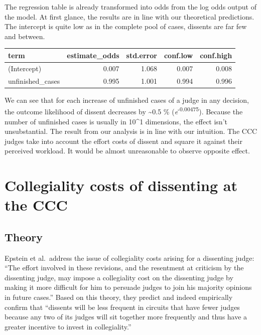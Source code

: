 \documentclass[
  11pt,
]{article}
\begin{document}
The regression table is already transformed into odds from the log odds
output of the model. At first glance, the results are in line with our
theoretical predictions. The intercept is quite low as in the complete
pool of cases, dissents are far few and between.

\begin{longtable}[]{@{}lrrrr@{}}
\toprule\noalign{}
term & estimate\_odds & std.error & conf.low & conf.high \\
\midrule\noalign{}
\endhead
\bottomrule\noalign{}
\endlastfoot
(Intercept) & 0.007 & 1.068 & 0.007 & 0.008 \\
unfinished\_cases & 0.995 & 1.001 & 0.994 & 0.996 \\
\end{longtable}

We can see that for each increase of unfinished cases of a judge in any
decision, the outcome likelihood of dissent decreases by
\textasciitilde0.5 \% (\emph{e}\textsuperscript{-0.00475}). Because the
number of unfinished cases is usually in 10\^{}1 dimensions, the effect
isn't unsubstantial. The result from our analysis is in line with our
intuition. The CCC judges take into account the effort costs of dissent
and square it against their perceived workload. It would be almost
unreasonable to observe opposite effect.

\hypertarget{collegiality-costs-of-dissenting-at-the-ccc}{%
\section{Collegiality costs of dissenting at the
CCC}\label{collegiality-costs-of-dissenting-at-the-ccc}}

\hypertarget{theory-1}{%
\subsection{Theory}\label{theory-1}}

Epstein et al.~address the issue of collegiality costs arising for a
dissenting judge: ``The effort involved in these revisions, and the
resentment at criticism by the dissenting judge, may impose a
collegiality cost on the dissenting judge by making it more difficult
for him to persuade judges to join his majority opinions in future
cases.'' Based on this theory, they predict and indeed empirically
confirm that ``dissents will be less frequent in circuits that have
fewer judges because any two of its judges will sit together more
frequently and thus have a greater incentive to invest in
collegiality.''
\end{document}
